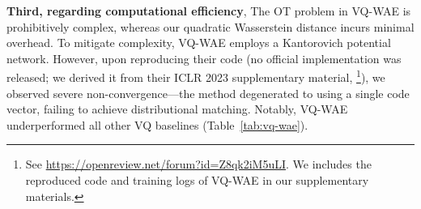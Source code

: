 \begin{table}[!t]
\centering
\caption{Reconstruction performance ($\downarrow:$ the lower the better and $\uparrow:$ the higher the better). $^{\dagger}$:Results cited from VQ-WAE~\cite{Vuong2023VectorQW}. Codebook size $K$ is fixed to $512$.}
\vspace{-2ex}
\label{tab:vq-wae}
\vspace{-4ex}
\end{table}

\textbf{Third, regarding computational efficiency}, The OT problem in VQ-WAE is prohibitively complex, whereas our quadratic Wasserstein distance incurs minimal overhead. To mitigate complexity, VQ-WAE employs a Kantorovich potential network. However, upon reproducing their code (no official implementation was released; we derived it from their ICLR 2023 supplementary material, \footnote{See \url{https://openreview.net/forum?id=Z8qk2iM5uLI}. We includes the reproduced code and training logs of VQ-WAE in our supplementary materials.}), 
we observed severe non-convergence—the method degenerated to using a single code vector, failing to achieve distributional matching. Notably, VQ-WAE underperformed all other VQ baselines (Table~\ref{tab:vq-wae}).

